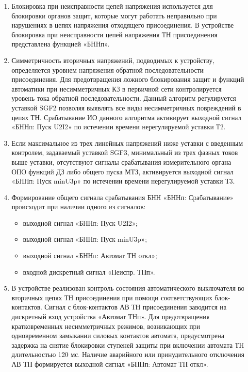 
\color{black}

\begin{enumerate}

\item
Блокировка при неисправности цепей напряжения используется для блокировки органов защит, которые могут работать неправильно при нарушениях в цепях напряжения отходящего присоединения. В устройстве блокировка при неисправности цепей напряжения ТН присоединения представлена функцией «БННп».

\item
Симметричность вторичных напряжений, подводимых к устройству, определяется уровнем напряжения обратной последовательности присоединения. Для предотвращения ложного блокирования защит и функций автоматики при несимметричных КЗ в первичной сети контролируется уровень тока обратной последовательности. Данный алгоритм регулируется уставкой SGF2 позволяя выявлять все виды несимметричных повреждений в цепях ТН. Срабатывание ИО данного алгоритма активирует выходной сигнал «БННп: Пуск U2I2» по истечении времени нерегулируемой уставки Т2.

\item
Если максимальное из трех линейных напряжений ниже уставки с введенным контролем, задаваемый уставкой SGF3, минимальный из трех фазных токов выше уставки, отсутствуют сигналы срабатывания измерительного органа ОПО функций ДЗ либо общего пуска МТЗ, активируется выходной сигнал «БННп: Пуск minU3p» по истечении времени нерегулируемой уставки Т3.

\item
Формирование общего сигнала срабатывания БНН «БННп: Срабатывание» происходит при наличии одного из сигналов:
\begin{itemize}
    \item выходной сигнал «БННп: Пуск U2I2»;
    \item выходной сигнал «БННп: Пуск minU3p»;
    \item выходной сигнал «БННп: Автомат ТН откл»;
    \item входной дискретный сигнал «Неиспр. ТНп».
\end{itemize}

\item
В устройстве реализован контроль состояния автоматического выключателя во вторичных цепях ТН присоединения при помощи соответствующих блок-контактов. Сигнал с блок-контактов АВ ТН присоединения заводится на дискретный вход устройства «Автомат ТНп». Для предотвращения кратковременных несимметричных режимов, возникающих при одновременном замыкании силовых контактов автомата, предусмотрена задержка на снятие блокировки ступеней защиты при включении автомата ТН длительностью 120 мс. Наличие аварийного или принудительного отключения АВ ТН формируется выходной сигнал «БННп: Автомат ТН откл».


\end{enumerate}
